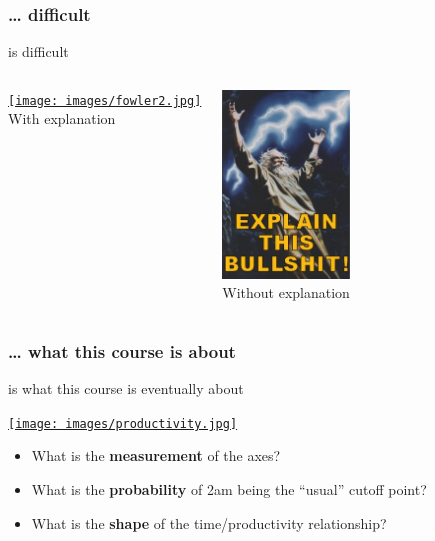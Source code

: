\documentclass{beamer}
\begin{document}
	\subsubsection{… difficult}
	
	\begin{frame}[c]{ is difficult}

		\begin{columns}[T]
			\begin{center}
				\href{http://jhfowler.ucsd.edu/alone_in_the_crowd.pdf}{\texttt{[image: images/fowler2.jpg]}}\\
				\vspace{0.25cm}
				With explanation
			\end{center}
			\begin{center}
				\includegraphics[height=5cm]{images/explain.jpg}\\
				\vspace{0.25cm}
				Without explanation
			\end{center}
		\end{columns}			
	\end{frame}

	\subsubsection{… what this course is about}
	
	\begin{frame}[t]{ is what this course is eventually about}
		
		\href{http://www.phdcomics.com/comics.php?f=1219}{\texttt{[image: images/productivity.jpg]}}
		
		\begin{itemize}
			\item What is the \textbf{measurement} of the axes?
		
			\item What is the \textbf{probability} of 2am being the ``usual'' cutoff point?
		
			\item What is the \textbf{shape} of the time/productivity relationship?
		
		\end{itemize}		
	\end{frame}
	
\end{document}
